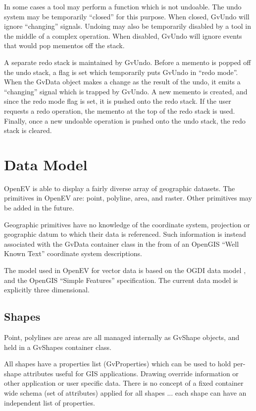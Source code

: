 \documentclass{openevreport}
\begin{document}
In some cases a tool may perform a function which is not undoable.
The undo system may be temporarily ``closed'' for this purpose.  When
closed, GvUndo will ignore ``changing'' signals.  Undoing may also be
temporarily disabled by a tool in the middle of a complex operation.
When disabled, GvUndo will ignore events that would pop mementos off the 
stack.

A separate redo stack is maintained by GvUndo.  Before a memento is
popped off the undo stack, a flag is set which temporarily puts GvUndo 
in ``redo mode''.  When the GvData object makes a change as the result
of the undo, it emits a ``changing'' signal which is trapped by
GvUndo.  A new memento is created, and since the redo mode flag is
set, it is pushed onto the redo stack.  If the user requests a redo
operation, the memento at the top of the redo stack is used.  Finally,
once a new undoable operation is pushed onto the undo stack, the redo
stack is cleared.

\chapter{Data Model}

OpenEV is able to display a fairly diverse array of geographic
datasets.   The primitives in OpenEV are: 
point, polyline, area, and raster.  Other primitives may be added in the
future.

Geographic primitives have no knowledge of the coordinate system,
projection or geographic datum to which their data is referenced.
Such information is instead associated with the GvData container class in
the from of an OpenGIS ``Well Known Text'' coordinate system descriptions. 

The model used in OpenEV for vector data is based on the OGDI data model
\cite{mor:ogdi}, and the OpenGIS ``Simple Features'' specification. 
The current data model is explicitly three dimensional.

\section{Shapes}

Point, polylines are areas are all managed internally as GvShape objects, 
and held in a GvShapes container class.  

All shapes have a properties list
(GvProperties) which can be used to hold per-shape attributes useful for GIS
applications. Drawing
override information or other application or user specific data.  There is
no concept of a fixed container wide schema (set of attributes) applied for
all shapes ... each shape can have an independent list of properties. 
\end{document}

